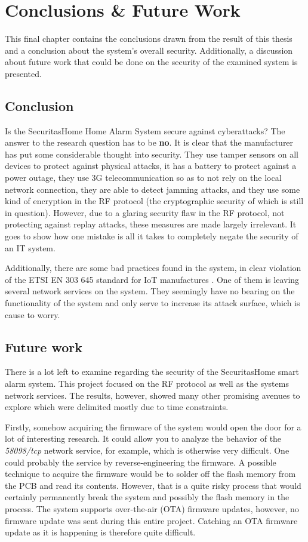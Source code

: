 \chapter{Conclusions \& Future Work} \label{ch:conclusion}
This final chapter contains the conclusions drawn from the result of this thesis and a conclusion about the system's overall security. Additionally, a discussion about future work that could be done on the security of the examined system is presented.

\section{Conclusion}
Is the SecuritasHome Home Alarm System secure against cyberattacks? The answer to the research question has to be \textbf{no}. It is clear that the manufacturer has put some considerable thought into security. They use tamper sensors on all devices to protect against physical attacks, it has a battery to protect against a power outage, they use 3G telecommunication so as to not rely on the local network connection, they are able to detect jamming attacks, and they use some kind of encryption in the RF protocol (the cryptographic security of which is still in question). However, due to a glaring security flaw in the RF protocol, not protecting against replay attacks, these measures are made largely irrelevant. It goes to show how one mistake is all it takes to completely negate the security of an IT system.

Additionally, there are some bad practices found in the system, in clear violation of the ETSI EN 303 645 standard for IoT manufactures \cite{etsi-iot-standard}. One of them is leaving several network services on the system. They seemingly have no bearing on the functionality of the system and only serve to increase its attack surface, which is cause to worry.

\section{Future work} \label{ch:conclusion:related-work}
There is a lot left to examine regarding the security of the SecuritasHome smart alarm system. This project focused on the RF protocol as well as the systems network services. The results, however, showed many other promising avenues to explore which were delimited mostly due to time constraints.

Firstly, somehow acquiring the firmware of the system would open the door for a lot of interesting research. It could allow you to analyze the behavior of the \textit{58098/tcp} network service, for example, which is otherwise very difficult. One could probably the service by reverse-engineering the firmware. A possible technique to acquire the firmware would be to solder off the flash memory from the PCB and read its contents. However, that is a quite risky process that would certainly permanently break the system and possibly the flash memory in the process. The system supports over-the-air (OTA) firmware updates, however, no firmware update was sent during this entire project. Catching an OTA firmware update as it is happening is therefore quite difficult.

